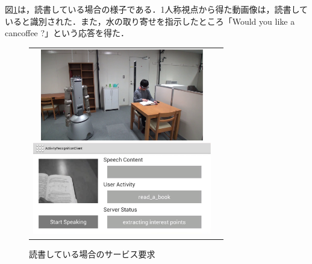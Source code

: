 図{\ref{fig:experiment_2_water_1}}は，読書している場合の様子である．1人称視点から得た動画像は，読書していると識別された．また，水の取り寄せを指示したところ「Would you like a cancoffee ?」という応答を得た．
%
\vspace{5mm}
\begin{figure}[htbp]
\begin{tabular}{cc}
%
  \begin{minipage}{0.5\textwidth}
    \begin{center}
      \includegraphics[height=40mm]{figure/experiment_2_water_1.eps}
    \end{center}
  \end{minipage}
%
  \begin{minipage}{0.5\textwidth}
    \begin{center}
      \includegraphics[height=40mm]{figure/experiment_2_water_1_a.eps}
    \end{center}
  \end{minipage}
%
\end{tabular}
\caption{読書している場合のサービス要求}
\label{fig:experiment_2_water_1}
\end{figure}


